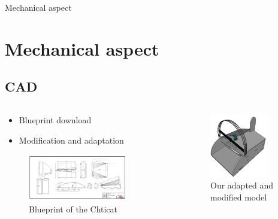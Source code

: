 \documentclass{beamer}
\begin{document}
	\begin{frame}{Mechanical aspect}
		\section[Mechanics]{Mechanical aspect}
		\subsection{CAD}
		\begin{columns}[T]
	  		\begin{column}{0.5\textwidth}
		    	\begin{itemize}
		    		\item Blueprint download
		    		\item Modification and adaptation
		    	\end{itemize}
		    	\begin{figure}
	    			\includegraphics[width=0.8\textwidth]{../Illus/Source_Chticat.png}
	    			\caption{Blueprint of the Chticat}
	    		 \end{figure}
	  		\end{column}
	  		\begin{column}{0.5\textwidth}
	    		\begin{figure}
	    			\includegraphics[width=0.8\textwidth]{../Illus/AeroProt.png}
	    			\caption{Our adapted and modified model}
	    		 \end{figure}
	  		\end{column}
		\end{columns}
		
	\end{frame}
\end{document}

